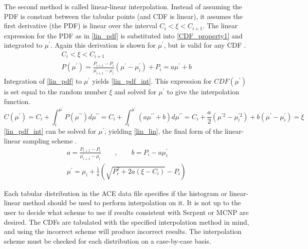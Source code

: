 The second method is called linear-linear interpolation.  Instead of assuming the PDF is constant between the tabular points (and CDF is linear), it assumes the first derivative (the PDF) is linear over the interval $C_i < \xi < C_{i+1}$.  The linear expression for the PDF as in \eqref{lin_pdf} is substituted into \eqref{CDF_property1} and integrated to $\mu^\prime$.  Again this derivation is shown for $\mu^\prime$, but is valid for any CDF \cite{openmc}.
\begin{equation}
\label{lin_pdf}
\begin{gathered}
C_i < \xi < C_{i+1} \\
P(\mu^\prime) = \frac{P_{i+1}-P_i}{\mu^\prime_{i+1}-\mu^\prime_i}(\mu^\prime - \mu^\prime_i) + P_i = a \mu^\prime + b
\end{gathered}
\end{equation}
%
Integration of \eqref{lin_pdf} to $\mu^\prime$ yields \eqref{lin_pdf_int}.  This expression for $CDF(\mu^\prime)$ is set equal to the random number $\xi$ and solved for $\mu^\prime$ to give the interpolation function.
%
\begin{equation}
\label{lin_pdf_int}
C(\mu^\prime) = C_i  + \int_i^{\mu^\prime} P(\mu^{\prime\prime}) d\mu^{\prime\prime}  =  C_i  + \int_i^{\mu^\prime} \left( a \mu^{\prime\prime} + b \right) d\mu^{\prime\prime} = C_i  + \frac{a}{2}(\mu^{\prime 2}-\mu^{\prime 2}_i) + b(\mu^\prime-\mu^\prime_i) = \xi 
\end{equation}
\eqref{lin_pdf_int} can be solved for $\mu^\prime$, yielding \eqref{lin_lin}, the final form of the linear-linear sampling scheme \cite{openmc}.
%
\begin{equation}
\label{lin_lin}
\begin{gathered}
a = \frac{P_{i+1}-P_i}{\mu^\prime_{i+1}-\mu^\prime_i} \qquad , \qquad b = P_i - a \mu^\prime_i \\
\mu^\prime = \mu_i + \frac{1}{a}\left( \sqrt{P^2_i + 2a(\xi -C_i)} -P_i \right)
\end{gathered}
\end{equation}

Each tabular distribution in the ACE data file specifies if the histogram or linear-linear method should be used to perform interpolation on it.  It is not up to the user to decide what scheme to use if results consistent with Serpent or MCNP are desired.  The CDFs are tabulated with the specified interpolation method in mind, and using the incorrect scheme will produce incorrect results.  The interpolation scheme must be checked for each distribution on a case-by-case basis. 

